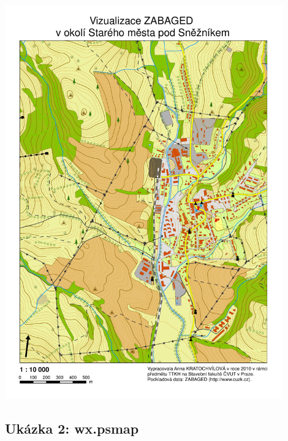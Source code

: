\documentclass[a4paper,12pt,draft]{article}
\begin{document}
\begin{center}
\includegraphics[width=0.9\textwidth]
{./map_vystupy/ArcGIS/zabaged.pdf}
\end{center}

\newpage
\subsection{Ukázka 2: wx.psmap}
\label{priloha:vystupy:psmap2}
\end{document}
